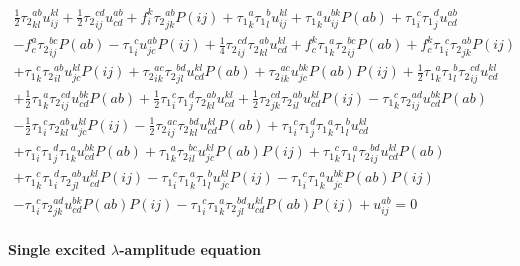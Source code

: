 \begin{gather*}
\frac{1}{2}{\tau_2}^{ab}_{kl} u^{kl}_{ij}
+ \frac{1}{2}{\tau_2}^{cd}_{ij} u^{ab}_{cd}
+ f^{k}_{i} {\tau_2}^{ab}_{jk} P(ij)
+ {\tau_1}^{a}_{k} {\tau_1}^{b}_{l} u^{kl}_{ij}
+ {\tau_1}^{a}_{k} u^{bk}_{ij} P(ab)
+ {\tau_1}^{c}_{i} {\tau_1}^{d}_{j} u^{ab}_{cd} \\
- f^{a}_{c} {\tau_2}^{bc}_{ij} P(ab)
- {\tau_1}^{c}_{i} u^{ab}_{jc} P(ij)   
+ \frac{1}{4}{\tau_2}^{cd}_{ij} {\tau_2}^{ab}_{kl} u^{kl}_{cd}
+ f^{k}_{c} {\tau_1}^{a}_{k} {\tau_2}^{bc}_{ij} P(ab)
+ f^{k}_{c} {\tau_1}^{c}_{i} {\tau_2}^{ab}_{jk} P(ij) \\
+ {\tau_1}^{c}_{k} {\tau_2}^{ab}_{il} u^{kl}_{jc} P(ij) 
+ {\tau_2}^{ac}_{ik} {\tau_2}^{bd}_{jl} u^{kl}_{cd} P(ab)
+ {\tau_2}^{ac}_{ik} u^{bk}_{jc} P(ab) P(ij)
+  \frac{1}{2}{\tau_1}^{a}_{k} {\tau_1}^{b}_{l} {\tau_2}^{cd}_{ij} u^{kl}_{cd} \\
+  \frac{1}{2}{\tau_1}^{a}_{k} {\tau_2}^{cd}_{ij} u^{bk}_{cd} P(ab)
+  \frac{1}{2}{\tau_1}^{c}_{i} {\tau_1}^{d}_{j} {\tau_2}^{ab}_{kl} u^{kl}_{cd}
+  \frac{1}{2}{\tau_2}^{cd}_{jk} {\tau_2}^{ab}_{il} u^{kl}_{cd} P(ij) 
- {\tau_1}^{c}_{k} {\tau_2}^{ad}_{ij} u^{bk}_{cd} P(ab) \\
-  \frac{1}{2}{\tau_1}^{c}_{i} {\tau_2}^{ab}_{kl} u^{kl}_{jc} P(ij)
-  \frac{1}{2}{\tau_2}^{ac}_{ij} {\tau_2}^{bd}_{kl} u^{kl}_{cd} P(ab)
+ {\tau_1}^{c}_{i} {\tau_1}^{d}_{j} {\tau_1}^{a}_{k} {\tau_1}^{b}_{l} u^{kl}_{cd} \\
+ {\tau_1}^{c}_{i} {\tau_1}^{d}_{j} {\tau_1}^{a}_{k} u^{bk}_{cd} P(ab)
+ {\tau_1}^{a}_{k} {\tau_2}^{bc}_{il} u^{kl}_{jc} P(ab) P(ij)
+ {\tau_1}^{c}_{k} {\tau_1}^{a}_{l} {\tau_2}^{bd}_{ij} u^{kl}_{cd} P(ab) \\
+ {\tau_1}^{c}_{k} {\tau_1}^{d}_{i} {\tau_2}^{ab}_{jl} u^{kl}_{cd} P(ij)
- {\tau_1}^{c}_{i} {\tau_1}^{a}_{k} {\tau_1}^{b}_{l} u^{kl}_{jc} P(ij)
- {\tau_1}^{c}_{i} {\tau_1}^{a}_{k} u^{bk}_{jc} P(ab) P(ij)  \\
- {\tau_1}^{c}_{i} {\tau_2}^{ad}_{jk} u^{bk}_{cd} P(ab) P(ij)
- {\tau_1}^{c}_{i} {\tau_1}^{a}_{k} {\tau_2}^{bd}_{jl} u^{kl}_{cd} P(ab) P(ij)
+ u^{ab}_{ij} = 0
\end{gather*}



\paragraph{Single excited $\lambda$-amplitude equation}

